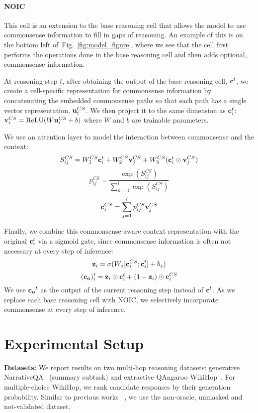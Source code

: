 \documentclass[11pt,a4paper]{article}
\def\figref#1{Fig.~\ref{#1}}
\newcommand{\fullModel}{NOIC}
\newcommand\bvect[1]{{\bf #1}}
\begin{document}
\paragraph{\fullModel}
This cell is an extension to the base reasoning cell that allows the model to use commonsense information to fill in gaps of reasoning.
An example of this is on the bottom left of~\figref{fig:model_figure}, where we see that the cell first performs the operations done in the base reasoning cell and then adds optional, commonsense information.

At reasoning step $t$, after obtaining the output of the base reasoning cell, $\bvect{c}^t$, we create a cell-specific representation for commonsense information
by concatenating the embedded commonsense paths so that each path has a single vector representation, $\bvect{u}^{CS}_i$.
We then project it to the same dimension as $\bvect{c}^t_i$:
\(\bvect{v}^{CS}_i = \text{ReLU}(W \bvect{u}_i^{CS} + b)\)
where $W$ and $b$ are trainable parameters.

We use an attention layer to model the interaction between commonsense and the context:
\[S_{ij}^{CS} = W_1^{CS} \bvect{c}^t_i + W_2^{CS} \bvect{v}^{CS}_j + W_3^{CS} (\bvect{c}^t_i \odot \bvect{v}^{CS}_j)\]
\[p_{ij}^{CS} = \frac{\exp(S^{CS}_{ij})}{\sum_{k=1}^l \exp(S^{CS}_{ij})}\]
\[\bvect{c}^{CS}_i = \sum_{j=1}^l p_{ij}^{CS} \bvect{v}^{CS}_j\]

Finally, we combine this commonsense-aware context representation with the original $\bvect{c}^t_i$ via a sigmoid gate, since commonsense information is often not necessary at every step of inference:
\[\bvect{z}_i = \sigma(W_z [\bvect{c}^{CS}_i; \bvect{c}^t_i] + b_z)\]
\[(\bvect{c_o})^t_i = \bvect{z}_i \odot \bvect{c}^t_i + (1 - \bvect{z}_i) \odot \bvect{c}^{CS}_i\]
We use $\bvect{c_o}^t$ as the output of the current reasoning step instead of $\bvect{c}^t$.
As we replace each base reasoning cell with \fullModel, we selectively incorporate commonsense at every step of inference.

  \section{Experimental Setup}

\noindent\textbf{Datasets:} We report results on two multi-hop reasoning datasets: generative NarrativeQA~\cite{kovcisky2017narrativeqa} (summary subtask) and extractive QAngaroo WikiHop~\cite{welbl2017constructing}.
For multiple-choice WikiHop, we rank candidate responses by their generation
probability. Similar to previous works ~\cite{dhingra2018neural}, we use
the non-oracle, unmasked and not-validated dataset.
\end{document}
